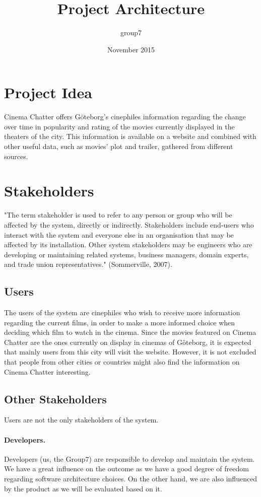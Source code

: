 \documentclass{article}
\title{Project Architecture}
\author{group7}
\date{November 2015}
\begin{document}
\maketitle

\section{Project Idea}
Cinema Chatter offers Göteborg's cinephiles information regarding the change over time in popularity and rating of the movies currently displayed in the theaters of the city. This information is available on a website and combined with other useful data, such as movies' plot and trailer, gathered from different sources.


\section{Stakeholders}
"The term stakeholder is used to refer to any person or group who will be affected by the system, directly or indirectly. Stakeholders include end-users who interact with the system and everyone else in an organisation that may be affected by its installation. Other system stakeholders may be engineers who are developing or maintaining related systems, business managers, domain experts, and trade union representatives." (Sommerville, 2007).
\subsection{Users}
The users of the system are cinephiles who wish to receive more information regarding the current films, in order to make a more informed choice when deciding which film to watch in the cinema. Since the movies featured on Cinema Chatter are the ones currently on display in cinemas of Göteborg, it is expected that mainly users from this city will visit the website. However, it is not excluded that people from other cities or countries might also find the information on Cinema Chatter interesting.

\subsection{Other Stakeholders}
Users are not the only stakeholders of the system.
\paragraph{Developers.} Developers (us, the Group7) are responsible to develop and maintain the system. We have a great influence on the outcome as we have a good degree of freedom regarding software architecture choices. On the other hand, we are also influenced by the product as we will be evaluated based on it.
\end{document}
